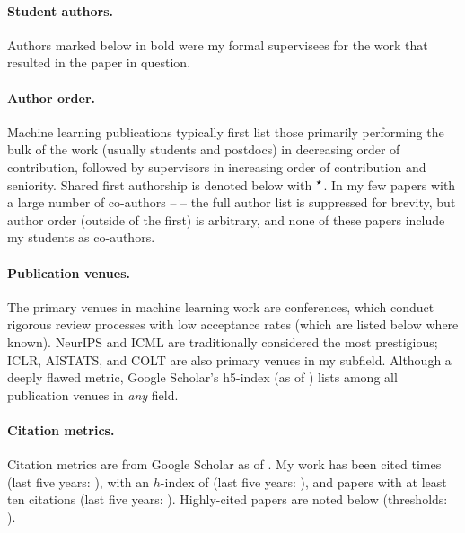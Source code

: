 \documentclass[10pt]{article}
\begin{document}
%

\paragraph{Student authors.} Authors marked below in bold were my formal supervisees for the work that resulted in the paper in question.

\paragraph{Author order.} Machine learning publications typically first list those primarily performing the bulk of the work (usually students and postdocs) in decreasing order of contribution,
followed by supervisors in increasing order of contribution and seniority.
Shared first authorship is denoted below with $^{\boldsymbol\star}$.
In my few papers with a large number of co-authors -- \lotsoauths{} -- the full author list is suppressed for brevity,
but author order (outside of the first) is arbitrary, and none of these papers include my students as co-authors.

\paragraph{Publication venues.} The primary venues in machine learning work are conferences,
which conduct rigorous review processes with low acceptance rates (which are listed below where known).
NeurIPS and ICML are traditionally considered the most prestigious;
ICLR, AISTATS, and COLT are also primary venues in my subfield.
Although a deeply flawed metric, Google Scholar's h5-index (as of \citeupdatedate{}) lists \hfiveinfo{} among all publication venues in \emph{any} field.

\paragraph{Citation metrics.}
Citation metrics are from Google Scholar as of \citeupdatedate{}.
My work has been cited \totalcites{} times (last five years: \totalcitesrec{}),
with an $h$-index of \hindex{} (last five years: \hindexrec{}),
and \itenindex{} papers with at least ten citations (last five years: \itenindexrec{}).
Highly-cited papers are noted below (thresholds: \citethreshes).
\end{document}
